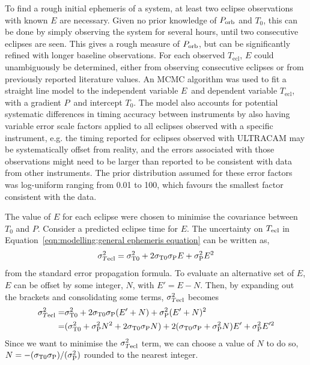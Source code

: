 To find a rough initial ephemeris of a system, at least two eclipse observations with known $E$ are necessary. Given no prior knowledge of $P_{\rm orb}$ and $T_0$, this can be done by simply observing the system for several hours, until two consecutive eclipses are seen. This gives a rough measure of $P_{\rm orb}$, but can be significantly refined with longer baseline observations.
For each observed $T_\mathrm{ecl}$, $E$ could unambiguously be determined, either from observing consecutive eclipses or from previously reported literature values.
An MCMC algorithm was used to fit a straight line model to the independent variable $E$\ and dependent variable $T_\mathrm{ecl}$, with a gradient $P$\ and intercept $T_0$.
The model also accounts for potential systematic differences in timing accuracy between instruments by also having variable error scale factors applied to all eclipses observed with a specific instrument, e.g. the timing reported for eclipses observed with ULTRACAM may be systematically offset from reality, and the errors associated with those observations might need to be larger than reported to be consistent with data from other instruments. The prior distribution assumed for these error factors was log-uniform ranging from 0.01 to 100, which favours the smallest factor consistent with the data.

The value of $E$ for each eclipse were chosen to minimise the covariance between $T_0$ and $P$.
Consider a predicted eclipse time for $E$. The uncertainty on $T_{\rm ecl}$ in Equation~\ref{eqn:modelling:general ephemeris equation} can be written as,
\begin{equation}
    \sigma_{T{\rm ecl}}^2 = \sigma_{\rm T0}^2 + 2\sigma_{\rm T0} \sigma_{\rm P}E + \sigma_{\rm P}^2 E^2
\end{equation}
from the standard error propagation formula.
To evaluate an alternative set of $E$, $E$ can be offset by some integer, $N$, with $E' = E - N$. Then, by expanding out the brackets and consolidating some terms, $\sigma_{T{\rm ecl}}^2$ becomes
\begin{align*}
    \sigma_{T{\rm ecl}}^2 =& \sigma_{\rm T0}^2 + 2\sigma_{\rm T0} \sigma_{\rm P}(E'+N) + \sigma_{\rm P}^2 (E'+N)^2 \\
    =& (\sigma_{\rm T0}^2 + \sigma_{\rm P}^2 N^2 + 2\sigma_{\rm T0} \sigma_{\rm P} N) + 2(\sigma_{\rm T0} \sigma_{\rm P} + \sigma_{\rm P}^2 N)E' + \sigma_{\rm P}^2 E'^2
\end{align*}
Since we want to minimise the $\sigma_{T{\rm ecl}}^2$ term, we can choose a value of $N$ to do so, $N = -(\sigma_{\rm T0}\sigma_{\rm P})/(\sigma_{\rm P}^2)$ rounded to the nearest integer.


